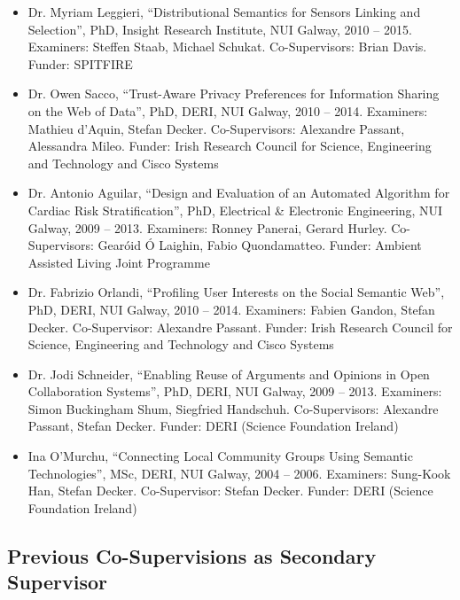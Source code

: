 \documentclass[10pt,a4paper]{res} %
\begin{document}
\begin{resume}
\begin{itemize}
\item Dr. Myriam Leggieri, ``Distributional Semantics for Sensors Linking and Selection'', PhD, Insight Research Institute, NUI Galway, 2010 -- 2015. Examiners: Steffen Staab, Michael Schukat. Co-Supervisors: Brian Davis. Funder: SPITFIRE %
\item Dr. Owen Sacco, ``Trust-Aware Privacy Preferences for Information Sharing on the Web of Data'', PhD, DERI, NUI Galway, 2010 -- 2014. Examiners: Mathieu d'Aquin, Stefan Decker. Co-Supervisors: Alexandre Passant, Alessandra Mileo. Funder: Irish Research Council for Science, Engineering and Technology and Cisco Systems %
\item Dr. Antonio Aguilar, ``Design and Evaluation of an Automated Algorithm for Cardiac Risk Stratification'', PhD, Electrical \& Electronic Engineering, NUI Galway, 2009 -- 2013. Examiners: Ronney Panerai, Gerard Hurley. Co-Supervisors: Gear\'{o}id \'{O} Laighin, Fabio Quondamatteo. Funder: Ambient Assisted Living Joint Programme %
\item Dr. Fabrizio Orlandi, ``Profiling User Interests on the Social Semantic Web'', PhD, DERI, NUI Galway, 2010 -- 2014. Examiners: Fabien Gandon, Stefan Decker. Co-Supervisor: Alexandre Passant. Funder: Irish Research Council for Science, Engineering and Technology and Cisco Systems %
\item Dr. Jodi Schneider, ``Enabling Reuse of Arguments and Opinions in Open Collaboration Systems'', PhD, DERI, NUI Galway, 2009 -- 2013. Examiners: Simon Buckingham Shum, Siegfried Handschuh. Co-Supervisors: Alexandre Passant, Stefan Decker. Funder: DERI (Science Foundation Ireland) %
\item Ina O'Murchu, ``Connecting Local Community Groups Using Semantic Technologies'', MSc, DERI, NUI Galway, 2004 -- 2006. Examiners: Sung-Kook Han, Stefan Decker. Co-Supervisor: Stefan Decker. Funder: DERI (Science Foundation Ireland)
\end{itemize}

\subsection*{Previous Co-Supervisions as Secondary Supervisor}


\end{resume}
\end{document}
